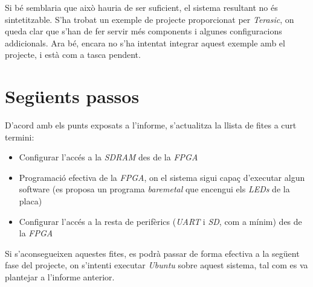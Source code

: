 \documentclass{article}
\begin{document}
Si bé semblaria que això hauria de ser suficient, el sistema resultant no és sintetitzable. S'ha trobat un exemple de projecte proporcionat per \textit{Terasic}, on queda clar que s'han de fer servir més components i algunes configuracions addicionals. Ara bé, encara no s'ha intentat integrar aquest exemple amb el projecte, i està com a tasca pendent.

\section{Següents passos}

D'acord amb els punts exposats a l'informe, s'actualitza la llista de fites a curt termini:
\begin{itemize}
\item Configurar l'accés a la \textit{SDRAM} des de la \textit{FPGA}
\item Programació efectiva de la \textit{FPGA}, on el sistema sigui capaç d'executar algun software (es proposa un programa \textit{baremetal} que encengui els \textit{LEDs} de la placa)
\item Configurar l'accés a la resta de perifèrics (\textit{UART} i \textit{SD}, com a mínim) des de la \textit{FPGA}
\end{itemize}

Si s'aconsegueixen aquestes fites, es podrà passar de forma efectiva a la següent fase del projecte, on s'intenti executar \textit{Ubuntu} sobre aquest sistema, tal com es va plantejar a l'informe anterior.
\end{document}
